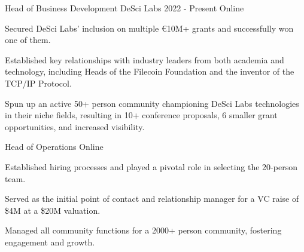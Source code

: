 
\begin{cventries}

  \cventry
    {Head of Business Development} %
    {DeSci Labs} %
    {2022 - Present} %
    {Online} %
    {
      \begin{cvitems} %
        \item {Secured DeSci Labs' inclusion on multiple €10M+ grants and successfully won one of them.}
        \item {Established key relationships with industry leaders from both academia and technology, including Heads of the Filecoin Foundation and the inventor of the TCP/IP Protocol.}
        \item {Spun up an active 50+ person community championing DeSci Labs technologies in their niche fields, resulting in 10+ conference proposals, 6 smaller grant opportunities, and increased visibility.}
      \end{cvitems}
    }

    \cventry
    {Head of Operations} %
    {} %
    {} %
    {Online} %
    {
      \begin{cvitems} %
        \item {Established hiring processes and played a pivotal role in selecting the 20-person team.}
        \item {Served as the initial point of contact and relationship manager for a VC raise of \$4M at a \$20M valuation.}
        \item {Managed all community functions for a 2000+ person community, fostering engagement and growth.}
      \end{cvitems}
    }


\end{cventries}
